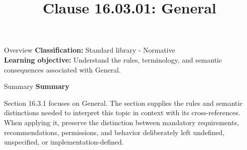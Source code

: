 \documentclass[10pt,letterpaper]{article}
\title{Clause 16.03.01: General}
\author{}
\date{}
\begin{document}
\maketitle
\begin{CornellOverviewBox}{Overview}
\textbf{Classification:} Standard library - Normative\\[2pt]
\textbf{Learning objective:} Understand the rules, terminology, and semantic consequences associated with General.
\end{CornellOverviewBox}\begin{CornellSummaryBox}{Summary}
{\sffamily\bfseries\color{Accent} Summary}\par\vspace{3pt}Section 16.3.1 focuses on General. The section supplies the rules and semantic distinctions needed to interpret this topic in context with its cross-references. When applying it, preserve the distinction between mandatory requirements, recommendations, permissions, and behavior deliberately left undefined, unspecified, or implementation-defined.
\end{CornellSummaryBox}
\end{document}
